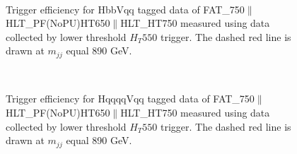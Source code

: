 \begin{figure}[htb]
\centering
       \\
\caption[Trigger efficiencies]{Trigger efficiency for HbbVqq tagged data of FAT\_750$\parallel$HLT\_PF(NoPU)HT650$\parallel$HLT\_HT750 measured using data collected by lower threshold $H_T550$ trigger. The dashed red line is drawn at $m_{jj}$ equal 890 GeV. }
  \label{fig:trigger efficiencies part2}
\end{figure}

\begin{figure}[htb]
\centering
      \\
\caption[Trigger efficiencies]{Trigger efficiency for HqqqqVqq tagged data of FAT\_750$\parallel$HLT\_PF(NoPU)HT650$\parallel$HLT\_HT750 measured using data collected by lower threshold $H_T550$ trigger. The dashed red line is drawn at $m_{jj}$ equal 890 GeV. }
  \label{fig:trigger efficiencies part3}
\end{figure}


\clearpage













